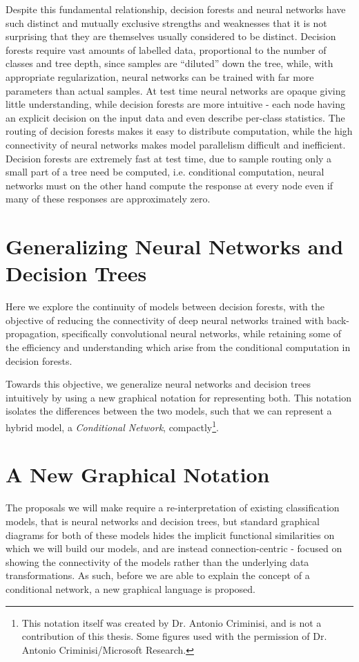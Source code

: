 \documentclass[thesis]{subfiles}
\begin{document}
	Despite this fundamental relationship, decision forests and neural networks have such distinct and mutually exclusive strengths and weaknesses that it is not surprising that they are themselves usually considered to be distinct. Decision forests require vast amounts of labelled data, proportional to the number of classes and tree depth, since samples are ``diluted'' down the tree, while, with appropriate regularization, neural networks can be trained with far more parameters than actual samples. At test time neural networks are opaque giving little understanding, while decision forests are more intuitive - each node having an explicit decision on the input data and even describe per-class statistics. The routing of decision forests makes it easy to distribute computation, while the high connectivity of neural networks makes model parallelism difficult and inefficient. Decision forests are extremely fast at test time, due to sample routing only a small part of a tree need be computed, i.e. conditional computation, neural networks must on the other hand compute the response at every node even if many of these responses are approximately zero.
	
	\section{Generalizing Neural Networks and Decision Trees}
	Here we explore the continuity of models between decision forests, with the objective of reducing the connectivity of deep neural networks trained with back-propagation, specifically convolutional neural networks, while retaining some of the efficiency and understanding which arise from the conditional computation in decision forests.
	
	Towards this objective, we generalize neural networks and decision trees intuitively by using a new graphical notation for representing both. This notation isolates the differences between the two models, such that we can represent a hybrid model, \ie a \emph{Conditional Network}, compactly\footnote{This notation itself was created by Dr. Antonio Criminisi, and is not a contribution of this thesis. Some figures used with the permission of Dr. Antonio Criminisi/Microsoft Research.}.
	
	\section{A New Graphical Notation}
	The proposals we will make require a re-interpretation of existing classification models, that is neural networks and decision trees, but standard graphical diagrams for both of these models hides the implicit functional similarities on which we will build our models, and are instead connection-centric - focused on showing the connectivity of the models rather than the underlying data transformations. As such, before we are able to explain the concept of a conditional network, a new graphical language is proposed.
	
\end{document}
